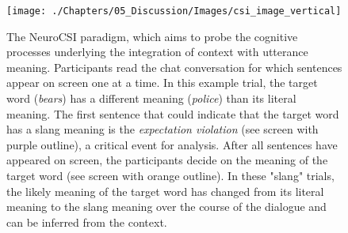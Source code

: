 \begin{figure}[!h]
	\centering
	\texttt{[image: ./Chapters/05\_Discussion/Images/csi\_image\_vertical]}
	\caption{The NeuroCSI paradigm, which aims to probe the cognitive processes underlying the integration of context with utterance meaning. Participants read the chat conversation for which sentences appear on screen one at a time. In this example trial, the target word (\textit{bears}) has a different meaning (\textit{police}) than its literal meaning. The first sentence that could indicate that the target word has a slang meaning is the \textit{expectation violation} (see screen with purple outline), a critical event for analysis. After all sentences have appeared on screen, the participants decide on the meaning of the target word (see screen with orange outline). In these "slang" trials, the likely meaning of the target word has changed from its literal meaning to the slang meaning over the course of the dialogue and can be inferred from the context. }
    \vspace*{-10pt}
	\label{fig:csi}
\end{figure}